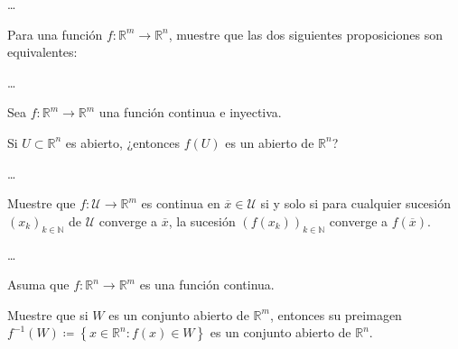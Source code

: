 \documentclass{testfcuni} %
\begin{document}
\begin{questions}
  \begin{solution}
    \ldots
  \end{solution}

  \question
  Para una función $f\colon\mathds{R}^{m}\rightarrow\mathds{R}^{n}$,
  muestre que las dos siguientes proposiciones son equivalentes:


  \begin{solution}
    \ldots
  \end{solution}

  \question

  Sea $f\colon\mathds{R}^{m}\rightarrow\mathds{R}^{m}$ una función
  continua e inyectiva.

  Si $U\subset\mathds{R}^{n}$ es abierto, ¿entonces $f\left(U\right)$
  es un abierto de $\mathds{R}^{n}$?

  \begin{solution}
    \ldots
  \end{solution}

  \question

  Muestre que $f\colon\mathcal{U}\rightarrow\mathds{R}^{m}$ es
  continua en $\overline{x}\in\mathcal{U}$ si y solo si para
  cualquier sucesión ${\left(x_{k}\right)}_{k\in\mathds{N}}$ de
  $\mathcal{U}$ converge a $\overline{x}$, la sucesión
  ${\left(f\left(x_{k}\right)\right)}_{k\in\mathds{N}}$ converge a
  $f\left(\overline{x}\right)$.

  \begin{solution}
    \ldots
  \end{solution}

  \question

  Asuma que $f\colon\mathds{R}^{n}\rightarrow\mathds{R}^{m}$ es una
  función continua.

  Muestre que si $W$ es un conjunto abierto de $\mathds{R}^{m}$,
  entonces su preimagen
  $f^{-1}\left(W\right)\coloneqq\left\{x\in\mathds{R}^{n}\colon f\left(x\right)\in W \right\}$
  es un conjunto abierto de $\mathds{R}^{n}$.


\end{questions}
\end{document}
